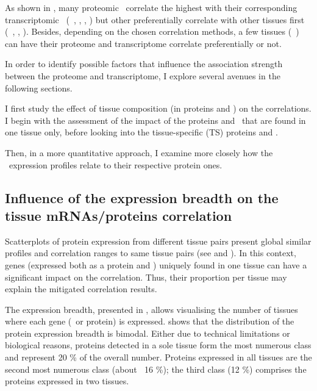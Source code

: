 As shown in ,
many proteomic \treps\ correlate the highest with
their corresponding transcriptomic \trep\
(\eg\ \liver, \testis, \ovary, \pancreas)
but other preferentially correlate with other tissues first
(\eg\ \bladder, \Oesophagus, \gallbladder).
Besides, depending on the chosen correlation methods,
a few tissues (\eg\ \heart) can have
their proteome and transcriptome correlate preferentially or not.\\
\vspace{-\baselineskip}

In order to identify possible factors
that influence the association strength
between the proteome and transcriptome,
I explore several avenues in the following sections.

I first study the effect of tissue composition (in proteins and \mRNAs)
on the correlations.
I begin with the assessment of the impact of the proteins and \mRNAs\
that are found in one tissue only,
before looking into the tissue-specific (\gls{TS}) proteins and \mRNAs{}.

Then, in a more quantitative approach,
I examine more closely how the \mRNA\ expression profiles relate
to their respective protein ones.

\subsection{Influence of the expression breadth on the tissue %
\texorpdfstring{\MakeLowercase{m}RNAs/proteins}{mRNAs/proteins} correlation}

Scatterplots of protein expression from different tissue pairs present
global similar profiles and correlation ranges to same tissue pairs
(see \Cref{ch:proteomics} and ).
In this context,
genes (expressed both as a protein and \mRNA)
uniquely found in one tissue can have a significant impact on the correlation.
Thus, their proportion per tissue may explain
the mitigated correlation results.%

The expression breadth, presented in ,
allows visualising the number of tissues
where each gene (\mRNA\ or protein) is expressed.
\Cref{fig:protBreadth} shows that
the distribution of the protein expression breadth is bimodal.
Either due to technical limitations or biological reasons,
proteins detected in a sole tissue form
the most numerous class and represent 20 \% of the overall number.
Proteins expressed in all tissues are the second most numerous class (about $~$ 16 \%);
the third class (12 \%) comprises the proteins expressed in two tissues.

